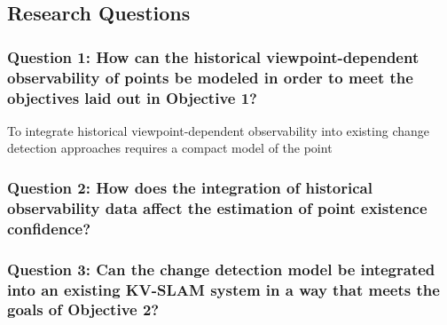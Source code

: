 \subsection{Research Questions}

\subsubsection*{Question 1: How can the historical viewpoint-dependent observability of points be modeled in order to meet the objectives laid out in Objective 1?}

To integrate historical viewpoint-dependent observability into existing change detection approaches requires a compact model of the point

\subsubsection*{Question 2: How does the integration of historical observability data affect the estimation of point existence confidence?}



\subsubsection*{Question 3: Can the change detection model be integrated into an existing KV-SLAM system in a way that meets the goals of Objective 2?}